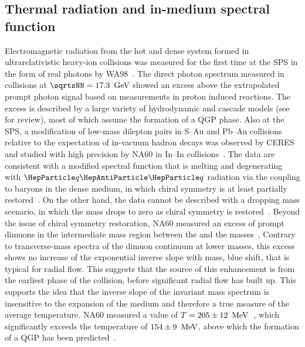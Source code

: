 \documentclass[../report.tex]{subfiles}
\begin{document}
\subsection{Thermal radiation and in-medium spectral function}
\label{sec:thermalradiation}

Electromagnetic radiation from the hot and dense system formed in ultrarelativistic heavy-ion collisions was measured for the first time at the SPS in the form of real photons by WA98~\cite{Aggarwal:2000th}. The direct photon spectrum measured in \PbPb{} collisions at $\sqrtsNN = \unit[17.3]{\UGeV}$ showed an excess above the extrapolated prompt photon signal based on measurements in proton induced reactions. 
The excess is described by a large variety of hydrodynamic and cascade models (see \cite{Peitzmann:2001mz} for review), most of which assume the formation of a QGP phase.
Also at the SPS, a modification of low-mass dilepton pairs in S--Au and Pb--Au collisions relative to the expectation of in-vacuum hadron decays was observed by CERES~\cite{Agakishiev:1995xb,Agakishiev:1997au,Adamova:2002kf,Agakichiev:2005ai,Adamova:2006nu} and studied with high precision by NA60 in In--In collisions~\cite{Arnaldi:2006jq,Arnaldi:2007ru,Arnaldi:2008fw,Specht:2010xu}. The data are consistent with a modified \PGr spectral function that is melting and degenerating with $\PQq\PAQq$ radiation via the coupling to baryons in the dense medium, in which chiral symmetry is at least partially restored~\cite{Rapp:1995zy,Rapp:1999us,Rapp:2009yu,Bazavov:2011nk,Hohler:2013eba}. On the other hand, the data cannot be described with a dropping mass scenario, in which the \PGr mass drops to zero as chiral symmetry is restored~\cite{Brown:1991kk}. Beyond the issue of chiral symmetry restoration, NA60 measured an excess of prompt dimuons in the intermediate mass region between the \PGf and the \PJGy masses~\cite{Arnaldi:2007ru,Arnaldi:2008fw}. Contrary to transverse-mass spectra of the dimuon continuum at lower masses, this excess shows no increase of the exponential inverse slope with mass, \ie blue shift, that is typical for radial flow. This suggests that the source of this enhancement is from the earliest phase of the collision, before significant radial flow has built up. 
This supports the idea that the inverse slope of the invariant mass spectrum is insensitive to the expansion of the medium and therefore a true measure of the average temperature. NA60 measured a value of $T=\unit[205\pm12]{\UMeV}$~\cite{Specht:2010xu}, which significantly exceeds the temperature of $\unit[154\pm9]{\UMeV}$, above which the formation of a QGP has been predicted~\cite{Borsanyi:2010bp,Bazavov:2014pvz}.
\end{document}
